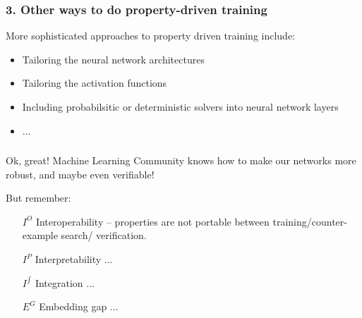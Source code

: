 \documentclass[t,compress,aspectratio=169]{beamer}
\begin{document}
 \begin{frame}
      \frametitle{3. Other ways to do property-driven training}

\begin{block}{More sophisticated approaches to property driven training include:}
\begin{itemize}
\item Tailoring the neural network architectures

\item Tailoring the activation functions

\item Including probabilsitic or deterministic solvers into neural network layers

\item $\ldots$
\end{itemize}
\end{block}

  {\scriptsize
 \begin{thebibliography}{99}
   \beamertemplatearticlebibitems
\end{thebibliography}}



\end{frame}

\begin{frame}
\frametitle{}
\vspace{5em}
\begin{alertblock}{Ok, great!}
 Machine Learning Community knows how to make our networks more robust, and maybe even verifiable!
\end{alertblock}
\pause
But remember:

\begin{block}{}
\begin{itemize}
\item[$I^O$] \alert{Interoperability -- properties are not portable between training/counter-example search/ verification.}

\item[$I^{P}$] \alert{Interpretability} $\ldots$

\item[$I^{\int}$] Integration $\ldots$

\item[$E^G$] Embedding gap $\ldots$
\end{itemize}
\end{block}
\end{frame}
\end{document}
